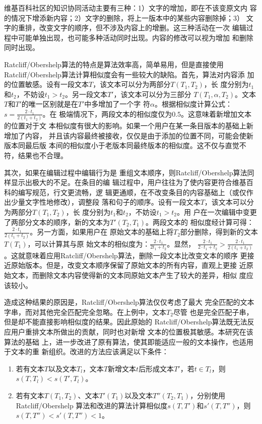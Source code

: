 维基百科社区的知识协同活动主要有三种：1）文字的增加，即在不该变原文内
容的情况下增添新内容；2）文字的删除，将上一版本中的某些内容删除掉；3）
文字的重排，改变文字的顺序，但不涉及内容上的增删。这三种活动在一次
编辑过程中可能单独出现，也可能多种活动同时出现。内容的修改可以视为增加
和删除同时出现。

Ratcliff/Obershelp算法的特点是算法效率高，简单易用，但是直接使用
Ratcliff/Obershelp算法计算相似度会有一些较大的缺陷。首先，算法对内容添
加的位置敏感。设有一段文本$T$，该文本可以分为两部分$T(T_1,T_2)$，长
度分别为$t_1$和$t_2$，不妨设$t_1>t_2$。另一段文本$T'$，该文本可以分为三部分
$T(T_1,\alpha,T_2)$。文本$T$和$T'$的唯一区别就是在$T'$中多增加了一个字
符$\alpha$。根据相似度计算公式：$s=\frac{2 \cdot t_1}{2(t_1+t_2)}$。在
极端情况下，两段文本的相似度仅为$0.5$。这意味着新增加文本的位置对于文
本相似度有很大的影响。如果一个用户在某一条目版本的基础上新增加了内容，
并且该内容最终被接收，仅仅是由于添加的位置不同，可能会使新版本同最后版
本间的相似度小于老版本同最终版本的相似度。这不仅与直觉不符，结果也不合理。

其次，如果在编辑过程中编辑行为是
重组文本顺序，则Ratcliff/Obershelp算法同样显示出极大的不足。在条目的编
辑过程中，用户往往为了使内容更符合维基百科的编写规范，行文更流畅，逻
辑更通顺，在不改变条目的内容基础上（或仅作出少量文字性地修改），调整段
落和句子的顺序。设有一段文本$T$，该文本可以分为两部分$T(T_1,T_2)$，长
度分别为$t_1$和$t_2$，不妨设$t_1>t_2$。用
户在一次编辑中变更了两部分文本的顺序，新的文本为$T'(T_2,T_1)$。两段文本的
相似度经计算可得：$\frac{2 \cdot t_1}{2(t_1+t_2)}$。另一方面，如果用户在
原始文本的基础上将$T_2$部分删除，得到新的文本$T(T_1)$，可以计算其与原
始文本的相似度为：$\frac{2 \cdot t_1}{2t_1+t_2}$。显然，
$
\frac{2 \cdot t_1}{2 \cdot t_1+t_2}>\frac{2 \cdot t_1}{2(t_1+t_2)}
$。这就意味着应用Ratcliff/Obershelp算法，删除一段文本比改变文本的顺序
更接近原始版本。但是，改变文本顺序保留了原始文本的所有内容，直观上更接
近原始文本，而删除文本内容使得新的文本同原始文本产生了较大的差异，相似
度应该较小。

造成这种结果的原因是，Ratcliff/Obershelp算法仅仅考虑了最大
完全匹配的文本字串，而对其他完全匹配完全忽略。在上例中，文本$T_2$尽管
也是完全匹配子串，但是却不能直接影响相似度的结果。因此原始的
Ratcliff/Obershelp算法既无法反应用户重排文本所做出的贡献，同时也对新增
文本的位置极其敏感。本研究在该算法的基础
上，进一步改进了原有算法，使其即能适应一般的文本操作，也适用于文本的重
新组织。改进的方法应该满足以下条件：
\begin{enumerate}
\item 若有文本$T$以及文本$T_l$，文本$T$新增文本$t$后形成文本$T'$，若$t
  \in T_l$，则$s(T,T_l)<s(T',T_l)$。
\item 若有文本$T(T_1,T_2)$、文本$T'(T_1)$以及文本$T''(T_2,T_1)$，分别使用Ratcliff/Obershelp
  算法和改进的算法计算相似度$s(T,T')$和$s'(T,T'')$，则$s(T,T'')<s'(T,T'')<1$。
\end{enumerate}

